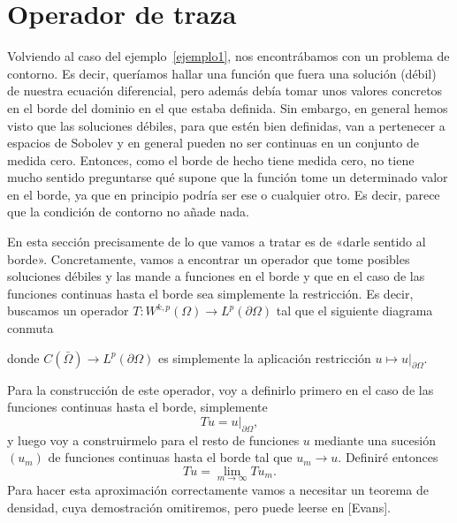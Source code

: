 \documentclass[12pt,a4paper]{book}
\theoremstyle{definition} \newtheorem{defn}[thm]{Definición}
\theoremstyle{definition} \newtheorem{ejemplo}[thm]{Ejemplo}
\theoremstyle{definition} \newtheorem{ejercicio}[thm]{Ejercicio}
\theoremstyle{remark} \newtheorem*{obs}{Observación}
\begin{document}
  \section{Operador de traza}
  Volviendo al caso del ejemplo~\ref{ejemplo1}, nos encontrábamos con un problema de contorno. Es decir, queríamos hallar una función que fuera una solución (débil) de nuestra ecuación diferencial, pero además debía tomar unos valores concretos en el borde del dominio en el que estaba definida. Sin embargo, en general hemos visto que las soluciones débiles, para que estén bien definidas, van a pertenecer a espacios de Sobolev y en general pueden no ser continuas en un conjunto de medida cero. Entonces, como el borde de hecho tiene medida cero, no tiene mucho sentido preguntarse qué supone que la función tome un determinado valor en el borde, ya que en principio podría ser ese o cualquier otro. Es decir, parece que la condición de contorno no añade nada.

  En esta sección precisamente de lo que vamos a tratar es de «darle sentido al borde». Concretamente, vamos a encontrar un operador que tome posibles soluciones débiles y las mande a funciones en el borde y que en el caso de las funciones continuas hasta el borde sea simplemente la restricción. Es decir, buscamos un operador $T:W^{k,p}(\Omega) \rightarrow L^p(\partial \Omega)$ tal que el siguiente diagrama conmuta
  \begin{center}
  \end{center}
  donde $C(\bar\Omega)\rightarrow L^p(\partial \Omega)$ es simplemente la aplicación restricción $u\mapsto u |_{\partial \Omega}$.

  Para la construcción de este operador, voy a definirlo primero en el caso de las funciones continuas hasta el borde, simplemente
  \begin{equation*}
    Tu = u|_{\partial \Omega},
  \end{equation*}
  y luego voy a construirmelo para el resto de funciones $u$ mediante una sucesión $(u_m)$ de funciones continuas hasta el borde tal que $u_m \rightarrow u$. Definiré entonces 
  \begin{equation*}
    Tu=\lim_{m\rightarrow \infty} Tu_m.
  \end{equation*}
  Para hacer esta aproximación correctamente vamos a necesitar un teorema de densidad, cuya demostración omitiremos, pero puede leerse en [Evans]. %
\end{document}
